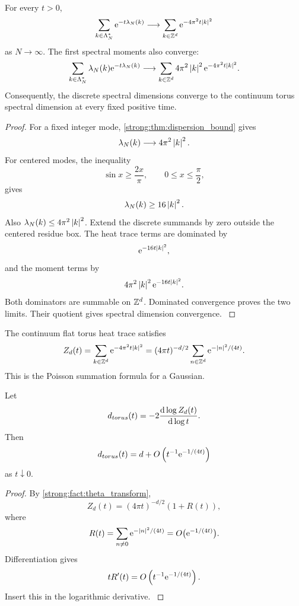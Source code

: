 \begin{theorem}\label{strong:theorem:040}\label{strong:thm:heat_trace_convergence}
For every \(t>0\),
\[
\sum_{k\in\Lambda_N^*}
\e^{-t\lambda_N(k)}
\longrightarrow
\sum_{k\in\ZZ^d}
\e^{-4\pi^2t\abs{k}^2}
\]
as \(N\to\infty\). The first spectral moments also converge:
\[
\sum_{k\in\Lambda_N^*}
\lambda_N(k)\e^{-t\lambda_N(k)}
\longrightarrow
\sum_{k\in\ZZ^d}
4\pi^2\abs{k}^2\e^{-4\pi^2t\abs{k}^2}.
\]
Consequently, the discrete spectral dimensions converge to the continuum torus spectral dimension at every fixed positive time.
\end{theorem}

\begin{proof}\label{strong:proof:065}
For a fixed integer mode, \cref{strong:thm:dispersion_bound} gives
\[
\lambda_N(k)\longrightarrow4\pi^2\left\lvert k\right\rvert^2.
\]
For centered modes, the inequality
\[
\sin x\geq\frac{2x}{\pi},
\qquad
0\leq x\leq\frac\pi2,
\]
gives
\[
\lambda_N(k)\geq16\left\lvert k\right\rvert^2.
\]
Also \(\lambda_N(k)\leq4\pi^2\left\lvert k\right\rvert^2\). Extend the discrete summands by zero outside the centered residue box. The heat trace terms are dominated by
\[
\e^{-16t\abs{k}^2},
\]
and the moment terms by
\[
4\pi^2\abs{k}^2\e^{-16t\abs{k}^2}.
\]
Both dominators are summable on \(\ZZ^d\). Dominated convergence proves the two limits. Their quotient gives spectral dimension convergence.
\label{strong:proof:065:end}\end{proof}

\begin{standardfact}\label{strong:standardfact:004}\label{strong:fact:theta_transform}
The continuum flat torus heat trace satisfies
\[
Z_d(t)
=
\sum_{k\in\ZZ^d}\e^{-4\pi^2t\abs{k}^2}
=
(4\pi t)^{-d/2}
\sum_{n\in\ZZ^d}\e^{-\abs{n}^2/(4t)}.
\]
This is the Poisson summation formula for a Gaussian.
\end{standardfact}

\begin{theorem}\label{strong:theorem:041}\label{strong:thm:continuum_dimension}
Let
\[
d_{\rm torus}(t)
=-2\frac{\dd\log Z_d(t)}{\dd\log t}.
\]
Then
\[
d_{\rm torus}(t)
=
 d+O\left(t^{-1}\e^{-1/(4t)}\right)
\]
as \(t\downarrow0\).
\end{theorem}

\begin{proof}\label{strong:proof:066}
By \cref{strong:fact:theta_transform},
\[
Z_d(t)
=(4\pi t)^{-d/2}(1+R(t)),
\]
where
\[
R(t)=\sum_{n\neq0}\e^{-\abs{n}^2/(4t)}
=O\bigl(\e^{-1/(4t)}\bigr).
\]
Differentiation gives
\[
tR'(t)=O\left(t^{-1}\e^{-1/(4t)}\right).
\]
Insert this in the logarithmic derivative.
\label{strong:proof:066:end}\end{proof}

